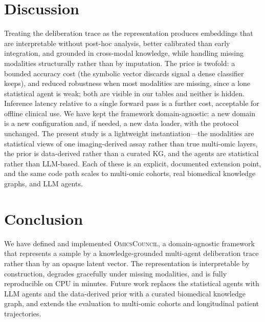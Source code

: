 \documentclass[runningheads]{llncs}
\begin{document}
\section{Discussion}
Treating the deliberation trace as the representation produces embeddings that are interpretable without post-hoc analysis, better calibrated than early integration, and grounded in cross-modal knowledge, while handling missing modalities structurally rather than by imputation. The price is twofold: a bounded accuracy cost (the symbolic vector discards signal a dense classifier keeps), and reduced robustness when most modalities are missing, since a lone statistical agent is weak; both are visible in our tables and neither is hidden. Inference latency relative to a single forward pass is a further cost, acceptable for offline clinical use. We have kept the framework domain-agnostic: a new domain is a new configuration and, if needed, a new data loader, with the protocol unchanged. The present study is a lightweight instantiation---the modalities are statistical views of one imaging-derived assay rather than true multi-omic layers, the prior is data-derived rather than a curated KG, and the agents are statistical rather than LLM-based. Each of these is an explicit, documented extension point, and the same code path scales to multi-omic cohorts, real biomedical knowledge graphs, and LLM agents.

\section{Conclusion}
We have defined and implemented \textsc{OmicsCouncil}, a domain-agnostic framework that represents a sample by a knowledge-grounded multi-agent deliberation trace rather than by an opaque latent vector. The representation is interpretable by construction, degrades gracefully under missing modalities, and is fully reproducible on CPU in minutes. Future work replaces the statistical agents with LLM agents and the data-derived prior with a curated biomedical knowledge graph, and extends the evaluation to multi-omic cohorts and longitudinal patient trajectories.



\end{document}
